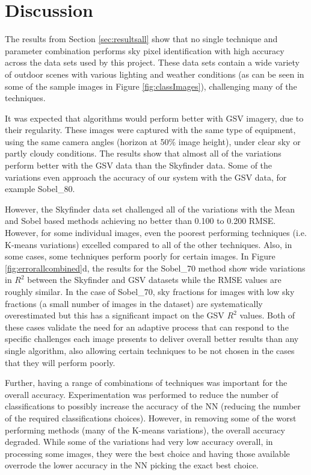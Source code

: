 \documentclass[final,3p,times,authoryear]{elsarticle}
\begin{document}
\section{Discussion}\label{sec:discussion}



The results from Section \ref{sec:resultsall} show that no single technique and parameter combination performs sky pixel identification with high accuracy across the data sets used by this project. These data sets contain a wide variety of outdoor scenes with various lighting and weather conditions (as can be seen in some of the sample images in Figure \ref{fig:classImages}), challenging many of the techniques. 

It was expected that algorithms would perform better with GSV imagery, due to their regularity. These images were captured with the same type of equipment, using the same camera angles (horizon at 50\% image height), under clear sky or partly cloudy conditions. The results show that almost all of the variations perform better with the GSV data than the Skyfinder data. Some of the variations even approach the accuracy of our system with the GSV data, for example Sobel\_80. 

However, the Skyfinder data set challenged all of the variations with the Mean and Sobel based methods achieving no better than 0.100 to 0.200 RMSE. However, for some individual images, even the poorest performing techniques (i.e. K-means variations) excelled compared to all of the other techniques. Also, in some cases, some techniques perform poorly for certain images. In Figure \ref{fig:errorallcombined}d, the results for the Sobel\_70 method show wide variations in $R^{2}$ between the Skyfinder and GSV datasets while the RMSE values are roughly similar. In the case of Sobel\_70, sky fractions for images with low sky fractions (a small number of images in the dataset) are systematically overestimated but this has a significant impact on the GSV $R^{2}$ values. Both of these cases validate the need for an adaptive process that can respond to the specific challenges each image presents to deliver overall better results than any single algorithm, also allowing certain techniques to be not chosen in the cases that they will perform poorly.

Further, having a range of combinations of techniques was important for the overall accuracy. Experimentation was performed to reduce the number of classifications to possibly increase the accuracy of the NN (reducing the number of the required classifications choices). However, in removing some of the worst performing methods (many of the K-means variations), the overall accuracy degraded. While some of the variations had very low accuracy overall, in processing some images, they were the best choice and having those available overrode the lower accuracy in the NN picking the exact best choice.
\end{document}
